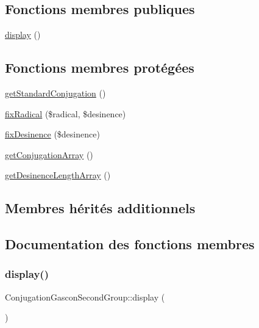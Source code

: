 \subsection*{Fonctions membres publiques}
\begin{DoxyCompactItemize}
\item 
\hyperlink{class_conjugation_gascon_second_group_a6e3085b2af7792e60d3126709d8c521e}{display} ()
\end{DoxyCompactItemize}
\subsection*{Fonctions membres protégées}
\begin{DoxyCompactItemize}
\item 
\hyperlink{class_conjugation_gascon_second_group_a53a63dc5e1a47aa4035efa26a1b45bf1}{get\+Standard\+Conjugation} ()
\item 
\hyperlink{class_conjugation_gascon_second_group_ad51616cc8f2024140f71255e7fcc681f}{fix\+Radical} (\$radical, \$desinence)
\item 
\hyperlink{class_conjugation_gascon_second_group_ae8d66e6a63002678daa884d3ca3a8ac1}{fix\+Desinence} (\$desinence)
\item 
\hyperlink{class_conjugation_gascon_second_group_a3702a68d3d15efe2b5109fe8800f7418}{get\+Conjugation\+Array} ()
\item 
\hyperlink{class_conjugation_gascon_second_group_a1584544e4c12dd19fa52703d37ced44d}{get\+Desinence\+Length\+Array} ()
\end{DoxyCompactItemize}
\subsection*{Membres hérités additionnels}


\subsection{Documentation des fonctions membres}
\hypertarget{class_conjugation_gascon_second_group_a6e3085b2af7792e60d3126709d8c521e}{}\label{class_conjugation_gascon_second_group_a6e3085b2af7792e60d3126709d8c521e} 
\subsubsection{\texorpdfstring{display()}{display()}}
{\footnotesize\ttfamily Conjugation\+Gascon\+Second\+Group\+::display (\begin{DoxyParamCaption}{ }\end{DoxyParamCaption})}



